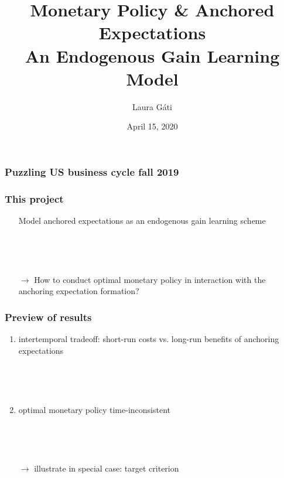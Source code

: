 \documentclass{beamer}
\author[]{Laura G\'ati}
\institute[]{Boston College}
\title[]{Monetary Policy \& Anchored Expectations \\
An Endogenous Gain Learning Model}
\date[]{April 15, 2020}
\def \myFigPath {../../figures/}
\begin{document}
\begin{frame}

\maketitle


\end{frame}



\begin{frame}
	\frametitle{Puzzling US business cycle fall 2019}

\begin{figure}[h!]
\hfil {}
\end{figure}


\end{frame}



\begin{frame}
	\frametitle{This project}
	
	\begin{enumerate}
	\item[] Model anchored expectations as an endogenous gain learning scheme
	
	\
	
	\
	
	\item[$\rightarrow$] How to conduct optimal monetary policy in interaction with the anchoring expectation formation?
	\end{enumerate}
	\end{frame}
\begin{frame}
	\frametitle{Preview of results}
	
	\begin{enumerate}
	\item  intertemporal tradeoff: short-run costs vs. long-run benefits of anchoring expectations
	
	\
	
	\
	
	\item optimal monetary policy time-inconsistent
	
	\
	
	\
	
	
	\item[$\rightarrow$] illustrate in special case: target criterion 
	\end{enumerate}


\end{frame}
\end{document}
